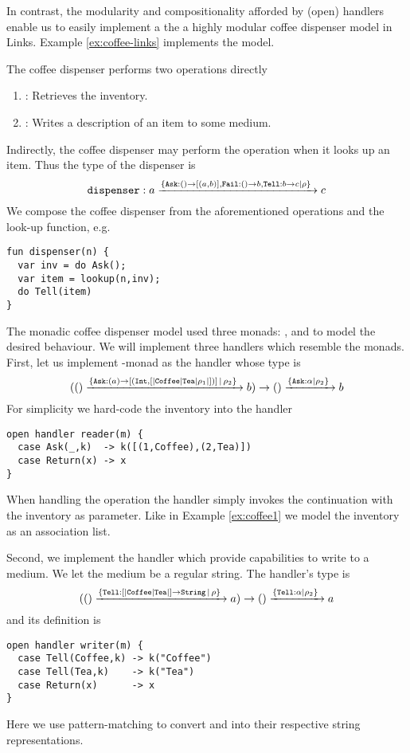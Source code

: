 In contrast, the modularity and compositionality afforded by (open) handlers enable us to easily implement a the a highly modular coffee dispenser model in Links. Example \ref{ex:coffee-links} implements the model. %
\begin{example}\label{ex:coffee-links}
The coffee dispenser performs two operations directly
\begin{enumerate}
  \item {}: Retrieves the inventory.
  \item {}: Writes a description of an item to some medium.
\end{enumerate}
Indirectly, the coffee dispenser may perform the  operation when it looks up an item. Thus the type of the dispenser is 
\[ \texttt{dispenser} : a \xrightarrow{\{\texttt{Ask}:() \to [(a, b)], \texttt{Fail}:() \to b,\texttt{Tell}:b \to c| \rho\}\;} c \]
We compose the coffee dispenser from the aforementioned operations and the look-up function, e.g.
\begin{lstlisting}[style=links]
fun dispenser(n) {
  var inv = do Ask();
  var item = lookup(n,inv);
  do Tell(item)
}
\end{lstlisting}
The monadic coffee dispenser model used three monads: ,  and  to model the desired behaviour. We will implement three handlers which resemble the monads. First, let us implement -monad as the handler  whose type is 
\[  (() \xrightarrow{\{\texttt{Ask}:(a) \to [(\texttt{Int}, [|\texttt{Coffee}|\texttt{Tea}|\rho_1|])] \, | \,\rho_2\}\;} b) \to () \xrightarrow{\{\texttt{Ask}:\alpha|\rho_2\}\;} b \]
For simplicity we hard-code the inventory into the handler
\begin{lstlisting}[style=links]
open handler reader(m) {
  case Ask(_,k)  -> k([(1,Coffee),(2,Tea)])
  case Return(x) -> x
}
\end{lstlisting}
When handling the operation  the handler simply invokes the continuation  with the inventory as parameter. Like in Example \ref{ex:coffee1} we model the inventory as an association list.

Second, we implement the handler  which provide capabilities to write to a medium. We let the medium be a regular string. The handler's type is
\[  (() \xrightarrow{\{\texttt{Tell}: [|\texttt{Coffee}|\texttt{Tea}|] \to \texttt{String} \, | \,\rho\}\;} a) \to () \xrightarrow{\{\texttt{Tell}:\alpha|\rho_2\}\;} a \]
and its definition is
\begin{lstlisting}[style=links]
open handler writer(m) {
  case Tell(Coffee,k) -> k("Coffee")
  case Tell(Tea,k)    -> k("Tea")
  case Return(x)      -> x
}
\end{lstlisting}
Here we use pattern-matching to convert  and  into their respective string representations.


\end{example}
